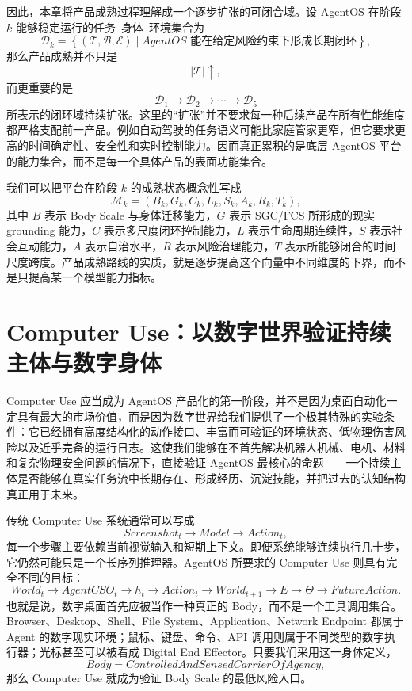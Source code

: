 因此，本章将产品成熟过程理解成一个逐步扩张的可闭合域。设 AgentOS 在阶段 $k$ 能够稳定运行的任务--身体--环境集合为
\[
\mathcal{D}_k
=
\left\{
(\mathcal{T},\mathcal{B},\mathcal{E})
\mid
AgentOS
\text{ 能在给定风险约束下形成长期闭环}
\right\},
\]
那么产品成熟并不只是
\[
|\mathcal{T}|\uparrow,
\]
而更重要的是
\[
\boxed{
\mathcal{D}_1
\rightarrow
\mathcal{D}_2
\rightarrow
\cdots
\rightarrow
\mathcal{D}_5
}
\]
所表示的闭环域持续扩张。这里的“扩张”并不要求每一种后续产品在所有性能维度都严格支配前一产品。例如自动驾驶的任务语义可能比家庭管家更窄，但它要求更高的时间确定性、安全性和实时控制能力。因而真正累积的是底层 AgentOS 平台的能力集合，而不是每一个具体产品的表面功能集合。

我们可以把平台在阶段 $k$ 的成熟状态概念性写成
\[
\mathcal{M}_k
=
\left(
B_k,
G_k,
C_k,
L_k,
S_k,
A_k,
R_k,
T_k
\right),
\]
其中 $B$ 表示 Body Scale 与身体迁移能力，$G$ 表示 SGC/FCS 所形成的现实 grounding 能力，$C$ 表示多尺度闭环控制能力，$L$ 表示生命周期连续性，$S$ 表示社会互动能力，$A$ 表示自治水平，$R$ 表示风险治理能力，$T$ 表示所能够闭合的时间尺度跨度。产品成熟路线的实质，就是逐步提高这个向量中不同维度的下界，而不是只提高某一个模型能力指标。

\section{Computer Use：以数字世界验证持续主体与数字身体}

Computer Use 应当成为 AgentOS 产品化的第一阶段，并不是因为桌面自动化一定具有最大的市场价值，而是因为数字世界给我们提供了一个极其特殊的实验条件：它已经拥有高度结构化的动作接口、丰富而可验证的环境状态、低物理伤害风险以及近乎完备的运行日志。这使我们能够在不首先解决机器人机械、电机、材料和复杂物理安全问题的情况下，直接验证 AgentOS 最核心的命题——一个持续主体是否能够在真实任务流中长期存在、形成经历、沉淀技能，并把过去的认知结构真正用于未来。

传统 Computer Use 系统通常可以写成
\[
Screenshot_t
\rightarrow
Model
\rightarrow
Action_t,
\]
每一个步骤主要依赖当前视觉输入和短期上下文。即便系统能够连续执行几十步，它仍然可能只是一个长序列推理器。AgentOS 所要求的 Computer Use 则具有完全不同的目标：
\[
\boxed{
World_t
\rightarrow
AgentCSO_t
\rightarrow
h_t
\rightarrow
Action_t
\rightarrow
World_{t+1}
\rightarrow
E
\rightarrow
\Theta
\rightarrow
FutureAction.
}
\]
也就是说，数字桌面首先应被当作一种真正的 Body，而不是一个工具调用集合。Browser、Desktop、Shell、File System、Application、Network Endpoint 都属于 Agent 的数字现实环境；鼠标、键盘、命令、API 调用则属于不同类型的数字执行器；光标甚至可以被看成 Digital End Effector。只要我们采用这一身体定义，
\[
\boxed{
Body
=
ControlledAndSensedCarrierOfAgency,
}
\]
那么 Computer Use 就成为验证 Body Scale 的最低风险入口。

